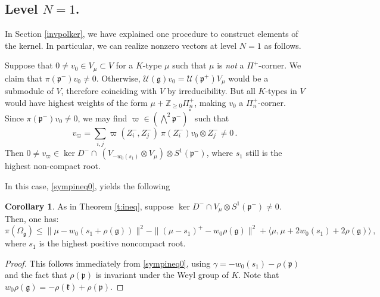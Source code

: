 \documentclass{amsart}[draft,11pt]
\newcommand{\mg}{\mathfrak{g}}
\newcommand{\fg}{{\mathfrak{g}}}
\newcommand{\fk}{{\mathfrak{k}}}
\newcommand{\fp}{{\mathfrak{p}}}
\numberwithin{equation}{section}
\theoremstyle{definition}
\newtheorem{corollary}[theorem]{Corollary}
\begin{document}
\subsection{Level $N=1$.}
\label{level1}
In Section \ref{invpolker}, we have explained one procedure to construct elements of the kernel. In particular, we can realize nonzero vectors at level $N=1$ as follows.

Suppose that $0\neq v_0\in V_\mu\subset V$ for a $K$-type $\mu$ such that $\mu$ is {\it not} a $\Pi^+$-corner. We claim that $\pi(\mathfrak p^-)v_0\neq 0$. Otherwise, $\mathcal U(\mathfrak g)v_0=\mathcal U(\mathfrak p^+) V_\mu$ would be a submodule of $V$, therefore coinciding with $V$ by irreducibility. But all $K$-types in $V$ would have highest weights of the form $\mu+\mathbb Z_{\ge 0}\Pi_n^+$, making $v_0$ a $\Pi_n^+$-corner. Since $\pi(\mathfrak p^-)v_0\neq 0$, we may find $\varpi\in ({\bigwedge}^2 \mathfrak p^-)^*$ such that 
\[
v_\varpi=\sum_{i,j}\varpi (Z_i^-,Z_j^-) ~\pi(Z_i^-)v_0\otimes Z_j^-\neq 0\,.
\]
Then $0\neq v_\varpi \in \ker D^-\cap ~(V_{-w_0(s_1)}\otimes V_\mu)\otimes S^1(\mathfrak p^-)$, where $s_1$ still is the highest non-compact root. 

In this case, \eqref{sympineq0}, yields the following
\begin{corollary} As in Theorem \ref{t:ineq}, suppose $\ker D^-\cap V_\mu\otimes S^1(\fp^-)\neq 0$. Then, one has:
\begin{equation}
    \pi(\Omega_\mg)\leq \|\mu-w_0(s_1+\rho(\fg))\|^2-\|(\mu-s_1)^+-w_0\rho(\fg)\|^2 +
\langle \mu,\mu +2w_0(s_1) +2\rho(\fg) \rangle\,,
\end{equation}
where $s_1$ is the highest positive noncompact root.
\end{corollary}

\begin{proof}
This follows immediately from \eqref{sympineq0}, using $\gamma=-w_0(s_1)-\rho(\fp)$ and the fact that $\rho(\fp)$ is invariant under the Weyl group of $K$. Note that $w_0\rho(\fg)=-\rho(\fk)+\rho(\fp)$.
\end{proof}
\end{document}
